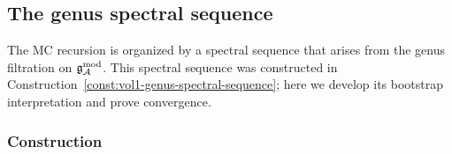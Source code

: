 \subsection{The genus spectral sequence}
\label{subsec:thqg-VII-genus-spectral-sequence}

The MC recursion is organized by a spectral sequence that arises
from the genus filtration on $\mathfrak{g}_{\mathcal{A}}^{\mathrm{mod}}$. This spectral sequence was
constructed in
Construction~\ref{const:vol1-genus-spectral-sequence}; here we
develop its bootstrap interpretation and prove convergence.

\subsubsection{Construction}
\label{subsubsec:thqg-VII-ss-construction}

